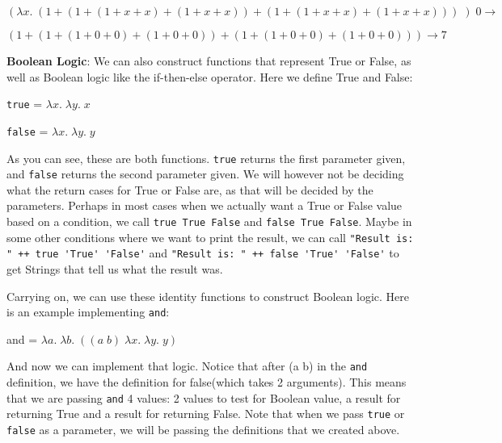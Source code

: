 \documentclass{article}
\begin{document}
        $(\lambda x. \; ( 1 + (1 + (1 + x + x) + (1 + x + x)) + (1 + (1 + x + x) + (1 + x + x)) ) \; ) \; 0 \rightarrow$
        
        $( 1 + (1 + (1 + 0 + 0) + (1 + 0 + 0)) + (1 + (1 + 0 + 0) + (1 + 0 + 0)) ) \rightarrow 7 $
        
        \bigskip\noindent
        \textbf{Boolean Logic}: We can also construct functions that represent True or False, as well as Boolean logic like the if-then-else operator. Here we define True and False:
        
        \medskip
        \lstinline{true} = $\lambda x. \; \lambda y. \; x$
        
        \lstinline{false} = $\lambda x. \; \lambda y. \; y$
        
        \medskip\noindent
        As you can see, these are both functions. \lstinline{true} returns the first parameter given, and \lstinline{false} returns the second parameter given. We will however not be deciding what the return cases for True or False are, as that will be decided by the parameters. Perhaps in most cases when we actually want a True or False value based on a condition, we call \lstinline{true True False} and \lstinline{false True False}. Maybe in some other conditions where we want to print the result, we can call \lstinline{"Result is: " ++ true 'True' 'False'} and \lstinline{"Result is: " ++ false 'True' 'False'} to get Strings that tell us what the result was.
        
        \medskip\noindent
        Carrying on, we can use these identity functions to construct Boolean logic. Here is an example implementing \lstinline{and}:
        
        \medskip
        and = $\lambda a. \; \lambda b. \; ((a \; b) \; \lambda x. \; \lambda y. \; y)$
        
        \medskip\noindent
        And now we can implement that logic. Notice that after (a b) in the \lstinline{and} definition, we have the definition for false(which takes 2 arguments). This means that we are passing \lstinline{and} 4 values: 2 values to test for Boolean value, a result for returning True and a result for returning False. Note that when we pass \lstinline{true} or \lstinline{false} as a parameter, we will be passing the definitions that we created above.
        
\end{document}
